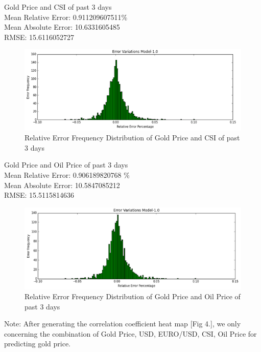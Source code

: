 \documentclass[runningheads]{llncs}
\begin{document}
\noindent Gold Price and CSI of past 3 days \\
Mean Relative Error: 0.911209607511\% \\
Mean Absolute Error:  10.6331605485 \\
RMSE: 15.6116052727 \\
\begin{figure}
\centering
\includegraphics[width=\textwidth]{GoldCSI_Daily.png}
\caption{Relative Error Frequency Distribution of Gold Price and CSI of past 3 days}
\label{fig:GoldCSI_Daily.png}
\end{figure}

\noindent Gold Price and Oil Price of past 3 days \\
Mean Relative Error: 0.906189820768 \% \\
Mean Absolute Error: 10.5847085212 \\
RMSE: 15.5115814636 \\
\begin{figure}
\centering
\includegraphics[width=\textwidth]{GoldOil_Daily.png}
\caption{Relative Error Frequency Distribution of Gold Price and Oil Price of past 3 days}
\label{fig:GoldOil_Daily.png}
\end{figure}

Note: After generating the correlation coefficient heat map [Fig 4.], we only concerning the combination of Gold Price, USD, EURO/USD, CSI, Oil Price for predicting gold price. \\
\end{document}
